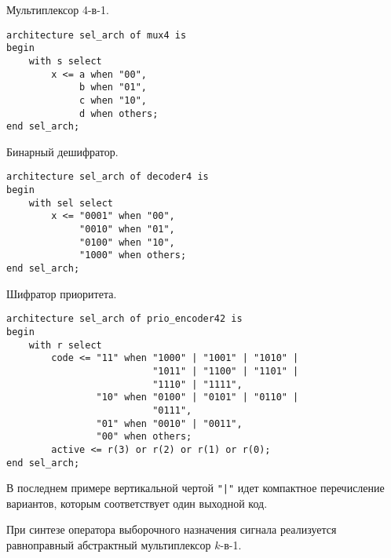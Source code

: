  Мультиплексор 4-в-1.

\begin{Code}
\begin{lstlisting}
architecture sel_arch of mux4 is
begin
    with s select
        x <= a when "00",
             b when "01",
             c when "10",
             d when others;
end sel_arch;
\end{lstlisting}
\end{Code}

 Бинарный дешифратор.

\begin{Code}
\begin{lstlisting}
architecture sel_arch of decoder4 is
begin
    with sel select
        x <= "0001" when "00",
             "0010" when "01",
             "0100" when "10",
             "1000" when others;
end sel_arch;
\end{lstlisting}
\end{Code}

 Шифратор приоритета.

\begin{Code}
\begin{lstlisting}
architecture sel_arch of prio_encoder42 is
begin
    with r select
        code <= "11" when "1000" | "1001" | "1010" |
                          "1011" | "1100" | "1101" |
                          "1110" | "1111",
                "10" when "0100" | "0101" | "0110" |
                          "0111",
                "01" when "0010" | "0011",
                "00" when others;
        active <= r(3) or r(2) or r(1) or r(0);
end sel_arch;
\end{lstlisting}
\end{Code}

В последнем примере вертикальной чертой \lstinline?"|"? идет компактное перечисление вариантов, которым соответствует один выходной код.

При синтезе оператора выборочного назначения сигнала реализуется равноправный абстрактный мультиплексор $k$-в-1.

